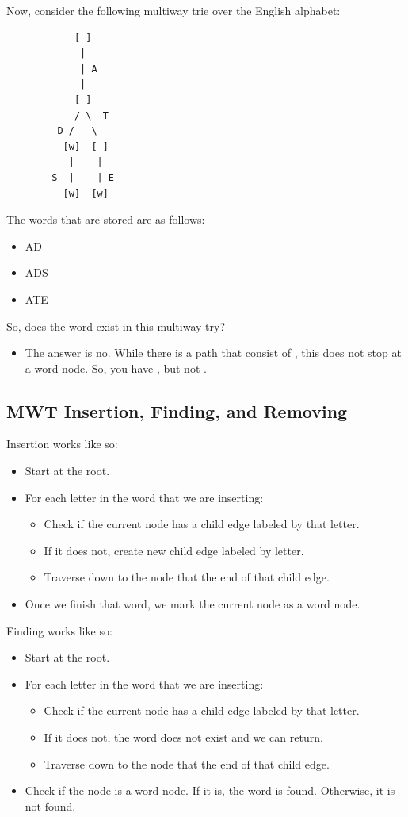 \documentclass[letterpaper]{article}
\begin{document}
Now, consider the following multiway trie over the English alphabet: 
\begin{verbatim}
            [ ]
             | 
             | A
             |
            [ ]
            / \  T
         D /   \ 
          [w]  [ ]
           |    |
        S  |    | E
          [w]  [w]
\end{verbatim}
The words that are stored are as follows: 
\begin{itemize}
    \item AD 
    \item ADS 
    \item ATE 
\end{itemize}
So, does the word  exist in this multiway try? 
\begin{itemize}
    \item The answer is no. While there is a path that consist of , this does not stop at a word node. So, you have , but not .
\end{itemize}


\subsection{MWT Insertion, Finding, and Removing}
Insertion works like so: 
\begin{itemize}
    \item Start at the root.
    \item For each letter in the word that we are inserting: 
    \begin{itemize}
        \item Check if the current node has a child edge labeled by that letter. 
        \item If it does not, create new child edge labeled by letter.
        \item Traverse down to the node that the end of that child edge. 
    \end{itemize}
    \item Once we finish that word, we mark the current node as a word node. 
\end{itemize}

Finding works like so: 
\begin{itemize}
    \item Start at the root. 
    \item For each letter in the word that we are inserting: 
    \begin{itemize}
        \item Check if the current node has a child edge labeled by that letter. 
        \item If it does not, the word does not exist and we can return. 
        \item Traverse down to the node that the end of that child edge. 
    \end{itemize}
    \item Check if the node is a word node. If it is, the word is found. Otherwise, it is not found. 
\end{itemize}
\end{document}
